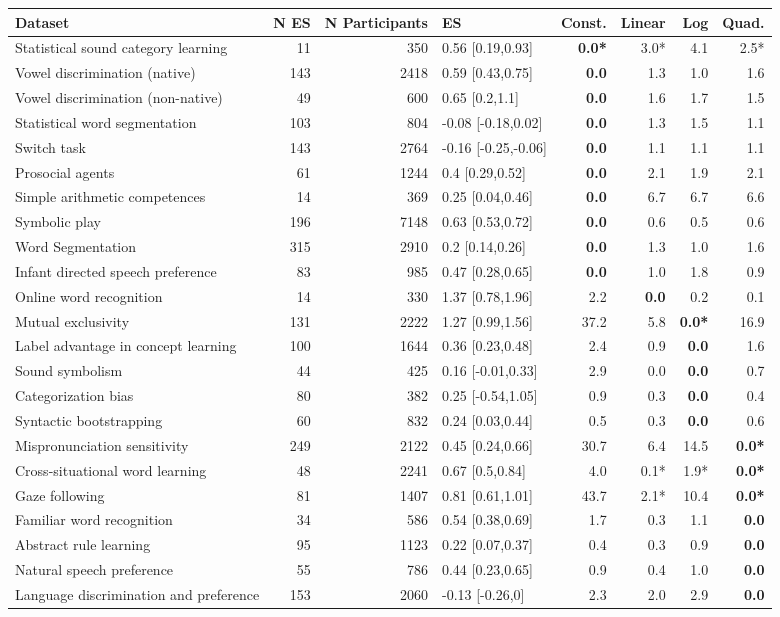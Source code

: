 \documentclass[10pt, letterpaper]{article}
\begin{document}
\begin{table}[ht]
\begin{tabular}{l|r|r|l|r|r|r|r}
\hline
\textbf{Dataset} & N ES & N Participants & ES & Const. & Linear & Log & Quad.\\
\hline
Statistical sound category learning  & 11 & 350 & 0.56 [0.19,0.93] & \textbf{0.0*} & 3.0* & 4.1 & 2.5*\\
Vowel discrimination (native) & 143 & 2418 & 0.59 [0.43,0.75] & \textbf{0.0} & 1.3 & 1.0 & 1.6\\
Vowel discrimination (non-native) & 49 & 600 & 0.65 [0.2,1.1] & \textbf{0.0} & 1.6 & 1.7 & 1.5\\
Statistical word segmentation & 103 & 804 & -0.08 [-0.18,0.02] & \textbf{0.0} & 1.3 & 1.5 & 1.1\\
Switch task & 143 & 2764 & -0.16 [-0.25,-0.06] & \textbf{0.0} & 1.1 & 1.1 & 1.1\\
Prosocial agents & 61 & 1244 & 0.4 [0.29,0.52] & \textbf{0.0} & 2.1 & 1.9 & 2.1\\
Simple arithmetic competences & 14 & 369 & 0.25 [0.04,0.46] & \textbf{0.0} & 6.7 & 6.7 & 6.6\\
Symbolic play & 196 & 7148 & 0.63 [0.53,0.72] & \textbf{0.0} & 0.6 & 0.5 & 0.6\\
Word Segmentation  & 315 & 2910 & 0.2 [0.14,0.26] & \textbf{0.0} & 1.3 & 1.0 & 1.6\\
Infant directed speech preference & 83 & 985 & 0.47 [0.28,0.65] & \textbf{0.0} & 1.0 & 1.8 & 0.9\\
Online word recognition & 14 & 330 & 1.37 [0.78,1.96] & 2.2 & \textbf{0.0} & 0.2 & 0.1\\
Mutual exclusivity & 131 & 2222 & 1.27 [0.99,1.56] & 37.2 & 5.8 & \textbf{0.0*} & 16.9\\
Label advantage in concept learning & 100 & 1644 & 0.36 [0.23,0.48] & 2.4 & 0.9 & \textbf{0.0} & 1.6\\
Sound symbolism & 44 & 425 & 0.16 [-0.01,0.33] & 2.9 & 0.0 & \textbf{0.0} & 0.7\\
Categorization bias & 80 & 382 & 0.25 [-0.54,1.05] & 0.9 & 0.3 & \textbf{0.0} & 0.4\\
Syntactic bootstrapping & 60 & 832 & 0.24 [0.03,0.44] & 0.5 & 0.3 & \textbf{0.0} & 0.6\\
Mispronunciation sensitivity & 249 & 2122 & 0.45 [0.24,0.66] & 30.7 & 6.4 & 14.5 & \textbf{0.0*}\\
Cross-situational word learning & 48 & 2241 & 0.67 [0.5,0.84] & 4.0 & 0.1* & 1.9* & \textbf{0.0*}\\
Gaze following  & 81 & 1407 & 0.81 [0.61,1.01] & 43.7 & 2.1* & 10.4 & \textbf{0.0*}\\
Familiar word recognition & 34 & 586 & 0.54 [0.38,0.69] & 1.7 & 0.3 & 1.1 & \textbf{0.0}\\
Abstract rule learning & 95 & 1123 & 0.22 [0.07,0.37] & 0.4 & 0.3 & 0.9 & \textbf{0.0}\\
Natural speech preference & 55 & 786 & 0.44 [0.23,0.65] & 0.9 & 0.4 & 1.0 & \textbf{0.0}\\
Language discrimination and preference & 153 & 2060 & -0.13 [-0.26,0] & 2.3 & 2.0 & 2.9 & \textbf{0.0}\\



\end{tabular}
\end{table}
\end{document}
